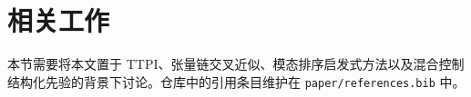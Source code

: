 \section{相关工作}

本节需要将本文置于 TTPI、张量链交叉近似、模态排序启发式方法以及混合控制结构化先验的背景下讨论。仓库中的引用条目维护在 \texttt{paper/references.bib} 中。
